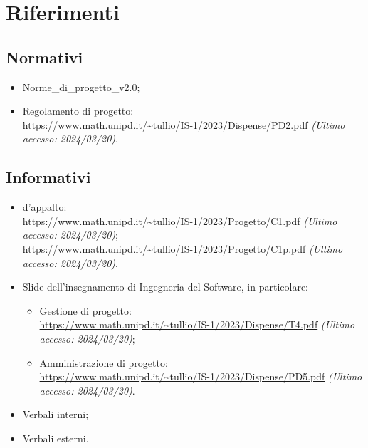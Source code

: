 \section{Riferimenti}
    \subsection{Normativi}
        \begin{itemize}
            \item Norme\_di\_progetto\_v2.0;
            \item Regolamento di progetto:\\
                \url{https://www.math.unipd.it/~tullio/IS-1/2023/Dispense/PD2.pdf} \textit{(Ultimo accesso: 2024/03/20)}.
    \end{itemize}
    \subsection{Informativi}
    \begin{itemize}
            \item {} d'appalto:\\
                    \url{https://www.math.unipd.it/~tullio/IS-1/2023/Progetto/C1.pdf} \textit{(Ultimo accesso: 2024/03/20)};\\
                    \url{https://www.math.unipd.it/~tullio/IS-1/2023/Progetto/C1p.pdf} \textit{(Ultimo accesso: 2024/03/20)}.
            \item Slide dell'insegnamento di Ingegneria del Software, in particolare:
            \begin{itemize}
                \item Gestione di progetto:\\
                \url{https://www.math.unipd.it/~tullio/IS-1/2023/Dispense/T4.pdf} \textit{(Ultimo accesso: 2024/03/20)};
                \item Amministrazione di progetto:\\
                \url{https://www.math.unipd.it/~tullio/IS-1/2023/Dispense/PD5.pdf} \textit{(Ultimo accesso: 2024/03/20)}.
            \end{itemize}
            \item Verbali interni;
            \item Verbali esterni.
    \end{itemize}

    \newpage